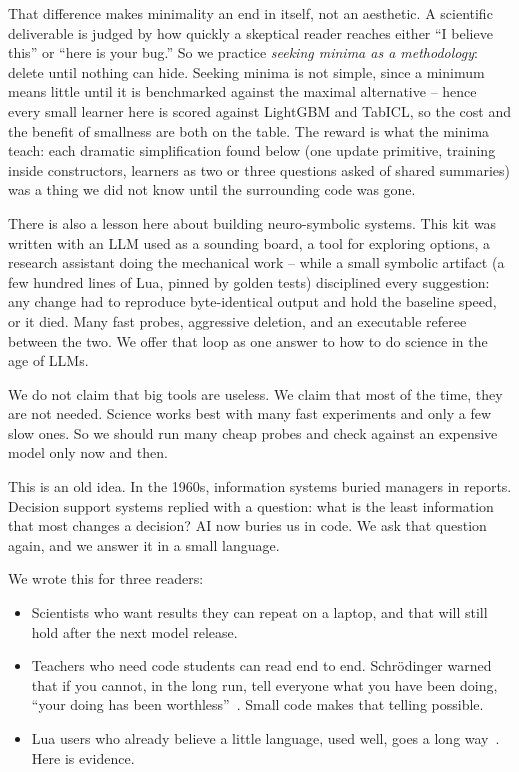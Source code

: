 \documentclass[AMA,STIX2COL]{WileyNJD-v2}
\begin{document}
That difference makes minimality an end in itself, not an
aesthetic.  A scientific deliverable is judged by how quickly a
skeptical reader reaches either ``I believe this'' or ``here is
your bug.''  So we practice \emph{seeking minima as a
methodology}: delete until nothing can hide.  Seeking minima is
not simple, since a minimum means little until it is benchmarked
against the maximal alternative -- hence every small learner here
is scored against LightGBM and TabICL, so the cost and the benefit
of smallness are both on the table.  The reward is what the minima
teach: each dramatic simplification found below (one update
primitive, training inside constructors, learners as two or three
questions asked of shared summaries) was a thing we did not know
until the surrounding code was gone.

There is also a lesson here about building neuro-symbolic systems.
This kit was written with an LLM used as a sounding board, a tool
for exploring options, a research assistant doing the mechanical
work -- while a small symbolic artifact (a few hundred lines of
Lua, pinned by golden tests) disciplined every suggestion: any
change had to reproduce byte-identical output and hold the
baseline speed, or it died.  Many fast probes, aggressive
deletion, and an executable referee between the two.  We offer
that loop as one answer to how to do science in the age of LLMs.

We do not claim that big tools are useless.  We claim that most of
the time, they are not needed.  Science works best with many fast
experiments and only a few slow ones.  So we should run many cheap
probes and check against an expensive model only now and then.

This is an old idea.  In the 1960s, information systems buried
managers in reports.  Decision support systems replied with a
question: what is the least information that most changes a decision?
AI now buries us in code.  We ask that question again, and we answer
it in a small language.

We wrote this for three readers:
\begin{itemize}
\item Scientists who want results they can repeat on a laptop, and
  that will still hold after the next model release.
\item Teachers who need code students can read end to end.
  Schr\"odinger warned that if you cannot, in the long run, tell
  everyone what you have been doing, ``your doing has been
  worthless''~\cite{schrodinger1951science}.  Small code makes that
  telling possible.
\item Lua users who already believe a little language, used well,
  goes a long way~\cite{ierusalimschy1996lua}.  Here is evidence.
\end{itemize}
\end{document}
